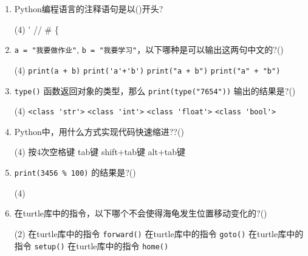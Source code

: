 \documentclass[11pt]{ctexart}
\begin{document}
\begin{enumerate}
        \item  Python编程语言的注释语句是以(\qquad)开头?
        \begin{tasks}(4)
            \task '
            \task //
            \task \#
            \task \{
        \end{tasks}

        \item \lstinline{a = "我要做作业"}, \lstinline!b = "我要学习"!，以下哪种是可以输出这两句中文的?(\qquad)
        \begin{tasks}(4)
            \task \lstinline!print(a + b)!
            \task \lstinline!print('a'+'b')!
            \task \lstinline!print("a + b")!
            \task \lstinline!print("a" + "b")!
        \end{tasks}

        \item \lstinline!type()! 函数返回对象的类型，那么 \lstinline!print(type("7654"))! 输出的结果是?(\qquad)
        \begin{tasks}(4)
            \task \lstinline!<class 'str'>!
            \task \lstinline!<class 'int'>!
            \task \lstinline!<class 'float'>!
            \task \lstinline!<class 'bool'>!
        \end{tasks}

        \item Python中，用什么方式实现代码快速缩进??(\qquad)
        \begin{tasks}(4)
            \task 按4次空格键
            \task tab键
            \task shift+tab键
            \task alt+tab键
        \end{tasks}

        \item \lstinline!print(3456 % 100)! 的结果是?(\qquad)
        \begin{tasks}(4)
        \end{tasks}

        \item 在turtle库中的指令，以下哪个不会使得海龟发生位置移动变化的?(\qquad)
        \begin{tasks}(2)
            \task 在turtle库中的指令 \lstinline{forward()}
            \task 在turtle库中的指令 \lstinline{goto()}
            \task 在turtle库中的指令 \lstinline{setup()}
            \task 在turtle库中的指令 \lstinline{home()}
        \end{tasks}


\end{enumerate}
\end{document}
